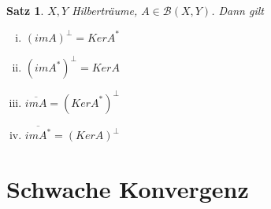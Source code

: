 \documentclass[ngerman]{report}
\theoremstyle{plain}%
\newtheorem{thm}{Satz}[chapter]
\theoremstyle{definition}%
\theoremstyle{myStyle}
\newcommand{\BS}[1][X,Y]{\mathcal{B}(#1)} %
\newcommand{\ov}[1]{\overline{#1}}
\begin{document}
	\begin{thm}
		$X,Y$ Hilberträume, $A\in \BS$. Dann gilt
			\begin{enumerate}[(i)]
				\item $(imA)^\perp = Ker A^*$
				\item $(imA^*)^\perp = Ker A$
				\item $\ov{imA} = (KerA^*)^\perp$
				\item $\ov{imA^*} = (KerA)^\perp$
			\end{enumerate}
	\end{thm}

	\section{Schwache Konvergenz}
\end{document}
